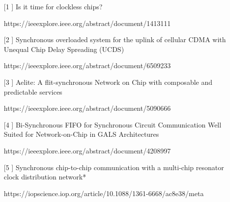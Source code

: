 \documentclass[a4paper,11pt]{report}
\begin{document}
\begin{itemize}
\item[[1]] Is it time for clockless chips?

https://ieeexplore.ieee.org/abstract/document/1413111

\item[[2]] Synchronous overloaded system for the uplink of cellular CDMA with Unequal Chip Delay Spreading (UCDS)

https://ieeexplore.ieee.org/abstract/document/6509233

\item[[3]] Aelite: A flit-synchronous Network on Chip with composable and predictable services

https://ieeexplore.ieee.org/abstract/document/5090666

\item[[4]] Bi-Synchronous FIFO for Synchronous Circuit Communication Well Suited for Network-on-Chip in GALS Architectures

https://ieeexplore.ieee.org/abstract/document/4208997

\item[[5]] Synchronous chip-to-chip communication with a multi-chip resonator clock distribution network*

https://iopscience.iop.org/article/10.1088/1361-6668/ac8e38/meta

\vspace{12pt}
\end{itemize}
\end{document}
